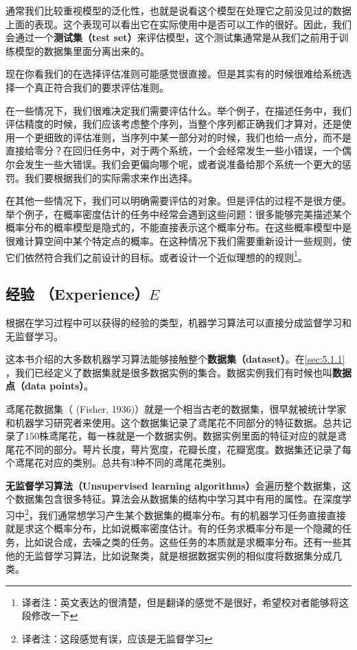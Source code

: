 通常我们比较重视模型的泛化性，也就是说看这个模型在处理它之前没见过的数据上面的表现。这个表现可以看出它在实际使用中是否可以工作的很好。因此，我们会通过一个\textbf{测试集（test set）}来评估模型，这个测试集通常是从我们之前用于训练模型的数据集里面分离出来的。

现在你看我们的在选择评估准则可能感觉很直接。但是其实有的时候很难给系统选择一个真正符合我们的要求评估准则。

在一些情况下，我们很难决定我们需要评估什么。举个例子，在描述任务中，我们评估精度的时候，我们应该考虑整个序列，当整个序列都正确我们才算对，还是使用一个更细致的评估准则，当序列中某一部分对的时候，我们也给一点分，而不是直接给零分？在回归任务中，对于两个系统，一个会经常发生一些小错误，一个偶尔会发生一些大错误。我们会更偏向哪个呢，或者说准备给那个系统一个更大的惩罚。我们要根据我们的实际需求来作出选择。

在其他一些情况下，我们可以明确需要评估的对象。但是评估的过程不是很方便。举个例子，在概率密度估计的任务中经常会遇到这些问题：很多能够完美描述某个概率分布的概率模型是隐式的，不能直接表示这个概率分布。在这些概率模型中是很难计算空间中某个特定点的概率。在这种情况下我们需要重新设计一些规则，使它们依然符合我们之前设计的目标。或者设计一个近似理想的的规则\footnote{译者注：英文表达的很清楚，但是翻译的感觉不是很好，希望校对者能够将这段修改一下}。



\subsection{经验 （Experience）$E$}
\label{sec:5.1.3}
根据在学习过程中可以获得的经验的类型，机器学习算法可以直接分成监督学习和无监督学习。

这本书介绍的大多数机器学习算法能够接触整个\textbf{数据集（dataset）}。在\ref{sec:5.1.1} ，我们已经定义了数据集就是很多数据实例的集合。数据实例我们有时候也叫\textbf{数据点（data points）}。

鸢尾花数据集（ (Fisher, 1936)）就是一个相当古老的数据集，很早就被统计学家和机器学习研究者来使用。这个数据集记录了鸢尾花不同部分的特征数据。总共记录了$150$株鸢尾花，每一株就是一个数据实例。数据实例里面的特征对应的就是鸢尾花不同的部分。萼片长度，萼片宽度，花瓣长度，花瓣宽度。数据集还记录了每个鸢尾花对应的类别。总共有3种不同的鸢尾花类别。

\textbf{无监督学习算法（Unsupervised learning algorithms）}会遍历整个数据集，这个数据集包含很多特征。算法会从数据集的结构中学习其中有用的属性。在深度学习中\footnote{译者注：这段感觉有误，应该是无监督学习}，我们通常想学习产生某个数据集的概率分布。有的机器学习任务直接直接就是求这个概率分布，比如说概率密度估计。有的任务求概率分布是一个隐藏的任务，比如说合成，去噪之类的任务。这些任务的本质就是求概率分布。还有一些其他的无监督学习算法，比如说聚类，就是根据数据实例的相似度将数据集分成几类。

